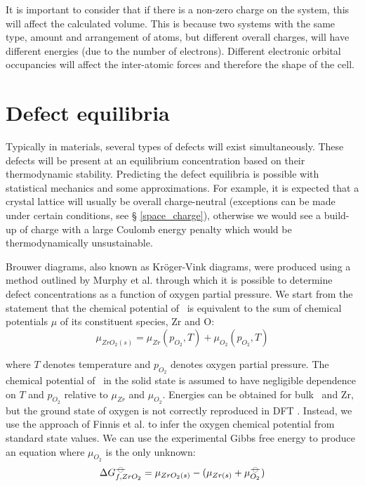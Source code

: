 It is important to consider that if there is a non-zero charge on the system, this will affect the calculated volume. This is because two systems with the same type, amount and arrangement of atoms, but different overall charges, will have different energies (due to the number of electrons). Different electronic orbital occupancies will affect the inter-atomic forces and therefore the shape of the cell. 

\section{Defect equilibria} \label{brouwer_method} %

Typically in materials, several types of defects will exist simultaneously. These defects will be present at an equilibrium concentration based on their thermodynamic stability. Predicting the defect equilibria is possible with statistical mechanics and some approximations. For example, it is expected that a crystal lattice will usually be overall charge-neutral (exceptions can be made under certain conditions, see § \ref{space_charge}), otherwise we would see a build-up of charge with a large Coulomb energy penalty which would be thermodynamically unsustainable.

Brouwer diagrams, also known as Kr{\"o}ger-Vink diagrams, were produced using a method outlined by Murphy et al. \cite{Murphy2014, Murphy2014a} through which it is possible to determine defect concentrations as a function of oxygen partial pressure. We start from the statement that the chemical potential of \zirconia\ is equivalent to the sum of chemical potentials $\mu$ of its constituent species, Zr and O:
\begin{equation}
{\mu}_{ZrO_2(s)} = {\mu}_{Zr}(p_{O_2}, T) + {\mu}_{O_{2}}(p_{O_{2}}, T)
\label{mewZrO2compmethodology}
\end{equation}

where $T$ denotes temperature and $p_{O_2}$ denotes oxygen partial pressure. The chemical potential of \zirconia\ in the solid state is assumed to have negligible dependence on $T$ and $p_{O_2}$ relative to ${\mu}_{Zr}$ and ${\mu}_{O_2}$. Energies can be obtained for bulk \zirconia\ and Zr, but the ground state of oxygen is not correctly reproduced in DFT \cite{Batyrev2000,Lozovoi2001}. Instead, we use the approach of Finnis et al. \cite{Finnis2005} to infer the oxygen chemical potential from standard state values. We can use the experimental Gibbs free energy to produce an equation where $\mu_{O_2}$ is the only unknown:
\begin{equation}
\Delta{G^{{\ensuremath{-\kern-4pt{\ominus}\kern-4pt-}}}_{f, ZrO_2}} = \mu_{ZrO_2(s)} - (\mu_{Zr(s)} + \mu^{{-\kern-4pt{\ominus}\kern-4pt-}}_{O_2})
\end{equation}

